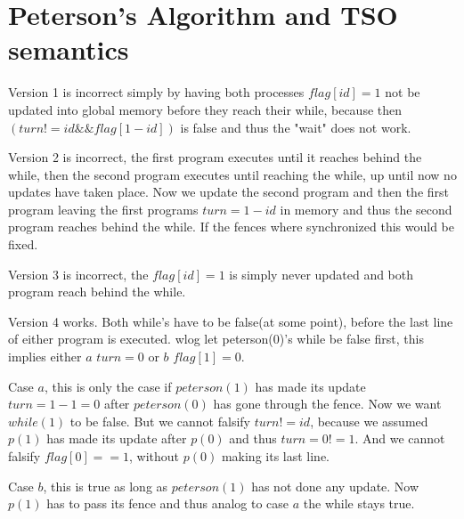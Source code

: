 \section{Peterson's Algorithm and TSO semantics}

Version 1 is incorrect simply by having both processes $flag[id]=1$ not be updated into global memory before they reach their while, because then $(turn!=id \&\& flag[1-id])$ is false and thus the "wait" does not work.

Version 2 is incorrect, the first program executes until it reaches behind the while, then the second program executes until reaching the while, up until now no updates have taken place. Now we update the second program and then the first program leaving the first programs $turn=1-id$ in memory and thus the second program reaches behind the while. If the fences where synchronized this would be fixed.

Version 3 is incorrect, the $flag[id]=1$ is simply never updated and both program reach behind the while.

Version 4 works. Both while's have to be false(at some point), before the last line of either program is executed. wlog let peterson(0)'s while be false first, this implies either $a$ $turn = 0$ or $b$ $flag[1]=0$.

Case $a$, this is only the case if $peterson(1)$ has made its update $turn=1-1=0$ after $peterson(0)$ has gone through the fence. Now we want $while(1)$ to be false. But we cannot falsify $turn!=id$, because we assumed $p(1)$ has made its update after $p(0)$ and thus $turn=0!=1$. And we cannot falsify $flag[0]==1$, without $p(0)$ making its last line.

Case $b$, this is true as long as $peterson(1)$ has not done any update. Now $p(1)$ has to pass its fence and thus analog to case $a$ the while stays true. 